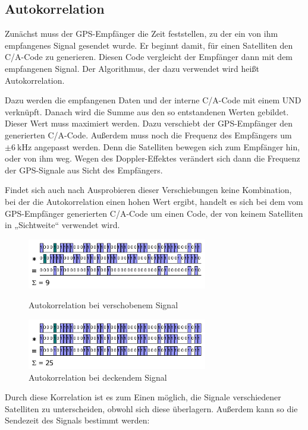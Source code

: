 \documentclass[12pt,a4paper]{scrartcl}
\begin{document}
\subsection{Autokorrelation}
\label{sec:correlation}
Zunächst muss der GPS-Empfänger die Zeit feststellen, zu der ein von ihm empfangenes Signal gesendet wurde. Er beginnt damit, für einen Satelliten den C/A-Code zu generieren. Diesen Code vergleicht der Empfänger dann mit dem empfangenen Signal. Der Algorithmus, der dazu verwendet wird heißt Autokorrelation.

Dazu werden die empfangenen Daten und der interne C/A-Code mit einem UND verknüpft. Danach wird die Summe aus den so entstandenen Werten gebildet. Dieser Wert muss maximiert werden. Dazu verschiebt der GPS-Empfänger den generierten C/A-Code. Außerdem muss noch die Frequenz des Empfängers um $\pm \SI{6}{\kilo\hertz}$ angepasst werden. Denn die Satelliten bewegen sich zum Empfänger hin, oder von ihm weg. Wegen des Doppler-Effektes verändert sich dann die Frequenz der GPS-Signale aus Sicht des Empfängers.

Findet sich auch nach Ausprobieren dieser Verschiebungen keine Kombination, bei der die Autokorrelation einen hohen Wert ergibt, handelt es sich bei dem vom GPS-Empfänger generierten C/A-Code um einen Code, der von keinem Satelliten in „Sichtweite“ verwendet wird.

\begin{figure}[H]
\centering
\includegraphics[width=0.7\textwidth]{img/ac_9.png}
\caption{Autokorrelation bei verschobenem Signal\cite{kowoma_signalv}}
\includegraphics[width=0.7\textwidth]{img/ac_25.png}
\caption{Autokorrelation bei deckendem Signal\cite{kowoma_signalv}}
\label{fig:ac}
\end{figure}

Durch diese Korrelation ist es zum Einen möglich, die Signale verschiedener Satelliten zu unterscheiden, obwohl sich diese überlagern. Außerdem kann so die Sendezeit des Signals bestimmt werden:
\end{document}
